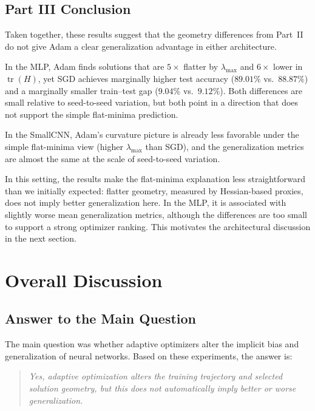 \documentclass[11pt]{article}
\begin{document}
\subsection{Part III Conclusion}

Taken together, these results suggest that the geometry differences from Part~II do not give Adam a clear generalization advantage in either architecture.

In the MLP, Adam finds solutions that are $5\times$ flatter by $\lambda_{\max}$ and $6\times$ lower in $\operatorname{tr}(H)$, yet SGD
achieves marginally higher test accuracy ($89.01\%$ vs.\ $88.87\%$) and a marginally smaller train--test gap ($9.04\%$ vs.\ $9.12\%$).
Both differences are small relative to seed-to-seed variation, but both point in a direction that does not support the simple flat-minima prediction.

In the SmallCNN, Adam's curvature picture is already less favorable under the simple flat-minima view (higher $\lambda_{\max}$ than SGD), and the generalization metrics are almost the same at the scale of seed-to-seed variation.

In this setting, the results make the flat-minima explanation less straightforward than we initially expected: flatter geometry, measured by Hessian-based proxies, does not imply better generalization here. In the MLP, it is associated with slightly worse mean generalization metrics, although the differences are too small to support a strong optimizer ranking. This motivates the architectural discussion in the next section.

\FloatBarrier

\section{Overall Discussion}

\subsection{Answer to the Main Question}

The main question was whether adaptive optimizers alter the implicit bias and generalization of neural networks. Based on these experiments, the answer is:
\begin{quote}
\emph{Yes, adaptive optimization alters the training trajectory and selected solution geometry, but this does not automatically imply better or worse generalization.}
\end{quote}
\end{document}
